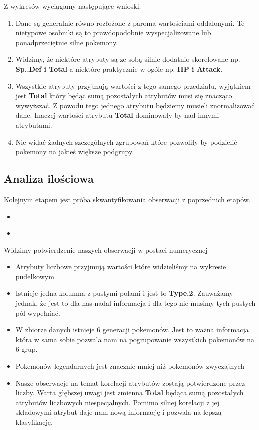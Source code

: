 \documentclass{article}
\newcommand{\rscript}[2]{
\begin{itemize}
\item[]
\end{itemize}
}
\begin{document}
Z wykresów wyciągamy następujące wnioski.
\begin{enumerate}
	\item Dane są generalnie równo rozłożone z paroma wartościami oddalonymi. Te nietypowe osobniki są to prawdopodobnie wyspecjalizowane lub ponadprzeciętnie silne pokemony. 
	\item Widzimy, że niektóre atrybuty są ze sobą silnie dodatnio skorelowane np. \textbf{Sp..Def i  Total} a niektóre praktycznie w ogóle np. \textbf{HP i Attack}.
	\item Wszystkie atrybuty przyjmują wartości z tego samego przedziału, wyjątkiem jest \textbf{Total} który będąc sumą pozostałych atrybutów musi się znacząco wywyższać. Z powodu tego jednego atrybutu będziemy musieli znormalizować dane. Inaczej wartości atrybutu \textbf{Total} dominowały by nad innymi atrybutami.
	\item Nie widać żadnych szczególnych zgrupowań które pozwoliły by podzielić pokemony na jakieś większe podgrupy.
\end{enumerate}

\clearpage

\subsection{Analiza ilościowa}

Kolejnym etapem jest próba skwantyfikowania obserwacji z poprzednich etapów.

\rscript{summary}{Podsumowanie danych}
\rscript{cor}{Korelacje}

\clearpage
Widzimy potwierdzenie naszych obserwacji w postaci numerycznej
\begin{itemize}
	\item Atrybuty liczbowe przyjmują wartości które widzieliśmy na wykresie pudełkowym
	\item Istnieje jedna kolumna z pustymi polami i jest to \textbf{Type.2}. Zauważamy jednak, że jest to dla nas nadal informacja i dla tego nie musimy tych pustych pól wypełniać.
	\item W zbiorze danych istnieje 6 generacji pokemonów. Jest to ważna informacja która w sama sobie pozwala nam na pogrupowanie wszystkich pokemonów na 6 grup.
	\item Pokemonów legendarnych jest znacznie mniej niż pokemonów zwyczajnych
	\item Nasze obserwacje na temat korelacji atrybutów zostają potwierdzone przez liczby. Warta głębszej uwagi jest zmienna \textbf{Total} będąca sumą pozostałych atrybutów liczbowych niespecjalnych. Pomimo silnej korelacji z jej składowymi atrybut daje nam nową informację i pozwala na lepszą klasyfikację.
\end{itemize}
\end{document}
